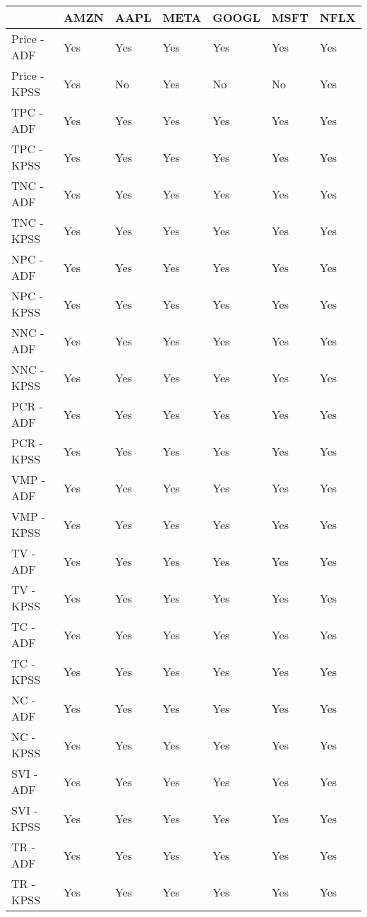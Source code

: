 \begin{tabular}{lllllll}
\toprule
{} & AMZN & AAPL & META & GOOGL & MSFT & NFLX \\
\midrule
Price - ADF  &  Yes &  Yes &  Yes &   Yes &  Yes &  Yes \\
Price - KPSS &  Yes &   No &  Yes &    No &   No &  Yes \\
TPC - ADF    &  Yes &  Yes &  Yes &   Yes &  Yes &  Yes \\
TPC - KPSS   &  Yes &  Yes &  Yes &   Yes &  Yes &  Yes \\
TNC - ADF    &  Yes &  Yes &  Yes &   Yes &  Yes &  Yes \\
TNC - KPSS   &  Yes &  Yes &  Yes &   Yes &  Yes &  Yes \\
NPC - ADF    &  Yes &  Yes &  Yes &   Yes &  Yes &  Yes \\
NPC - KPSS   &  Yes &  Yes &  Yes &   Yes &  Yes &  Yes \\
NNC - ADF    &  Yes &  Yes &  Yes &   Yes &  Yes &  Yes \\
NNC - KPSS   &  Yes &  Yes &  Yes &   Yes &  Yes &  Yes \\
PCR - ADF    &  Yes &  Yes &  Yes &   Yes &  Yes &  Yes \\
PCR - KPSS   &  Yes &  Yes &  Yes &   Yes &  Yes &  Yes \\
VMP - ADF    &  Yes &  Yes &  Yes &   Yes &  Yes &  Yes \\
VMP - KPSS   &  Yes &  Yes &  Yes &   Yes &  Yes &  Yes \\
TV - ADF     &  Yes &  Yes &  Yes &   Yes &  Yes &  Yes \\
TV - KPSS    &  Yes &  Yes &  Yes &   Yes &  Yes &  Yes \\
TC - ADF     &  Yes &  Yes &  Yes &   Yes &  Yes &  Yes \\
TC - KPSS    &  Yes &  Yes &  Yes &   Yes &  Yes &  Yes \\
NC - ADF     &  Yes &  Yes &  Yes &   Yes &  Yes &  Yes \\
NC - KPSS    &  Yes &  Yes &  Yes &   Yes &  Yes &  Yes \\
SVI - ADF    &  Yes &  Yes &  Yes &   Yes &  Yes &  Yes \\
SVI - KPSS   &  Yes &  Yes &  Yes &   Yes &  Yes &  Yes \\
TR - ADF     &  Yes &  Yes &  Yes &   Yes &  Yes &  Yes \\
TR - KPSS    &  Yes &  Yes &  Yes &   Yes &  Yes &  Yes \\
\bottomrule
\end{tabular}
